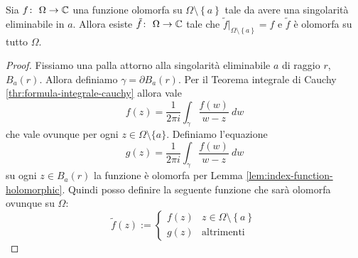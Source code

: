 \begin{theorem}
    Sia $f \colon\ \Omega \rightarrow \mathbb{C}$ una funzione olomorfa su $\Omega
    \setminus \left\{ a \right\}$ tale da avere una singolarità eliminabile
    in $a$. Allora esiste $\tilde{f} \colon\ \Omega \rightarrow \mathbb{C}$ tale che 
    $\tilde{f}|_{\Omega \setminus \left\{ a \right\}} = f$ e $\tilde{f}$ 
    è olomorfa su tutto $\Omega$.  
  \label{thr:distruzione-singolarita-semplici}
\end{theorem}
\begin{proof}
  Fissiamo una palla attorno alla singolarità eliminabile $a$ di raggio $r$,
  $B_a(r)$. Allora definiamo $\gamma = \partial B_a(r)$. Per il Teorema
  integrale di Cauchy \ref{thr:formula-integrale-cauchy} allora vale 
  \begin{equation*}
    f(z) = \frac{1}{2\pi i} \int_\gamma \frac{f(w)}{w-z}\ dw
  \end{equation*}
  che vale ovunque per ogni $z \in \Omega \setminus \{a\}$. Definiamo
  l'equazione 
  \begin{equation*}
    g(z) =  \frac{1}{2 \pi i} \int_\gamma \frac{f(w)}{w-z}\ dw
  \end{equation*}
  su ogni $z \in B_a(r)$ la funzione è olomorfa per Lemma
  \ref{lem:index-function-holomorphic}. Quindi posso definire la seguente
  funzione che sarà olomorfa ovunque su $\Omega$:
  \begin{equation*}
    \tilde{f}(z) := \begin{cases}
      f(z) & z \in \Omega \setminus \left\{ a \right\} \\
      g(z) & \text{altrimenti}
    \end{cases}
  \end{equation*}
\end{proof}

